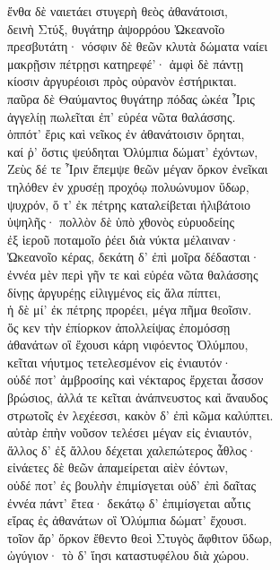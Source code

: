 \quad{}ἔνθα δὲ ναιετάει στυγερὴ θεὸς ἀθανάτοισι, \\
δεινὴ Στύξ, θυγάτηρ ἀψορρόου Ὠκεανοῖο\\
πρεσβυτάτη· νόσφιν δὲ θεῶν κλυτὰ δώματα ναίει \\
μακρῇσιν πέτρῃσι κατηρεφέ'· ἀμφὶ δὲ πάντῃ \\
κίοσιν ἀργυρέοισι πρὸς οὐρανὸν ἐστήρικται.\\
παῦρα δὲ Θαύμαντος θυγάτηρ πόδας ὠκέα Ἶρις \\
ἀγγελίῃ πωλεῖται ἐπ' εὐρέα νῶτα θαλάσσης. \\
ὁππότ' ἔρις καὶ νεῖκος ἐν ἀθανάτοισιν ὄρηται, \\
καί ῥ' ὅστις ψεύδηται Ὀλύμπια δώματ' ἐχόντων,\\
Ζεὺς δέ τε Ἶριν ἔπεμψε θεῶν μέγαν ὅρκον ἐνεῖκαι\\
τηλόθεν ἐν χρυσέῃ προχόῳ πολυώνυμον ὕδωρ,  \\
ψυχρόν, ὅ τ' ἐκ πέτρης καταλείβεται ἠλιβάτοιο \\
ὑψηλῆς· πολλὸν δὲ ὑπὸ χθονὸς εὐρυοδείης \\
ἐξ ἱεροῦ ποταμοῖο ῥέει διὰ νύκτα μέλαιναν· \\
Ὠκεανοῖο κέρας, δεκάτη δ' ἐπὶ μοῖρα δέδασται· \\
ἐννέα μὲν περὶ γῆν τε καὶ εὐρέα νῶτα θαλάσσης \\
δίνῃς ἀργυρέῃς εἱλιγμένος εἰς ἅλα πίπτει,\\
ἡ δὲ μί' ἐκ πέτρης προρέει, μέγα πῆμα θεοῖσιν. \\
ὅς κεν τὴν ἐπίορκον ἀπολλείψας ἐπομόσσῃ\\
ἀθανάτων οἳ ἔχουσι κάρη νιφόεντος Ὀλύμπου,\\
κεῖται νήυτμος τετελεσμένον εἰς ἐνιαυτόν·  \\
οὐδέ ποτ' ἀμβροσίης καὶ νέκταρος ἔρχεται ἆσσον\\
βρώσιος, ἀλλά τε κεῖται ἀνάπνευστος καὶ ἄναυδος\\
στρωτοῖς ἐν λεχέεσσι, κακὸν δ' ἐπὶ κῶμα καλύπτει.\\
αὐτὰρ ἐπὴν νοῦσον τελέσει μέγαν εἰς ἐνιαυτόν,\\
ἄλλος δ' ἐξ ἄλλου δέχεται χαλεπώτερος ἆθλος·  \\
εἰνάετες δὲ θεῶν ἀπαμείρεται αἰὲν ἐόντων,\\
οὐδέ ποτ' ἐς βουλὴν ἐπιμίσγεται οὐδ' ἐπὶ δαῖτας\\
ἐννέα πάντ' ἔτεα· δεκάτῳ δ' ἐπιμίσγεται αὖτις \\
εἴρας ἐς ἀθανάτων οἳ Ὀλύμπια δώματ' ἔχουσι. \\
τοῖον ἄρ' ὅρκον ἔθεντο θεοὶ Στυγὸς ἄφθιτον ὕδωρ,  \\
ὠγύγιον· τὸ δ' ἵησι καταστυφέλου διὰ χώρου. 

